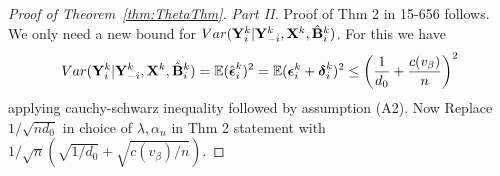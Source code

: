\documentclass[fleqn,11pt]{article}
\numberwithin{equation}{section}
\begin{document}
\begin{proof}[Proof of Theorem~\ref{thm:ThetaThm}]
%
%
%

\textit{Part II.} Proof of Thm 2 in 15-656 follows. We only need a new bound for $Var ({\mathbf{Y}}_i^k | {\mathbf{Y}}_{-i}^k, {\mathbf{X}}^k, \hat {{\mathbf{B}}}_i^k)$. For this we have
%
$$ Var ({\mathbf{Y}}_i^k | {\mathbf{Y}}_{-i}^k, {\mathbf{X}}^k, \hat {{\mathbf{B}}}_i^k) = {\mathbb{E}} (\hat {{\boldsymbol{\epsilon}}}_i^k)^2
= {\mathbb{E}} ( {\boldsymbol{\epsilon}}_i^k + {\boldsymbol{\delta}}_i^k)^2
\leq \left( \frac{1}{d_0} + \frac{c(v_\beta)}{n} \right)^2
$$
%
applying cauchy-schwarz inequality followed by assumption (A2). Now Replace $1/\sqrt{n d_0}$ in choice of $\lambda, \alpha_n$ in Thm 2 statement with $1/\sqrt{n} (\sqrt{1/d_0} + \sqrt{c(v_\beta)/ n})$.

\end{proof}
\end{document}
